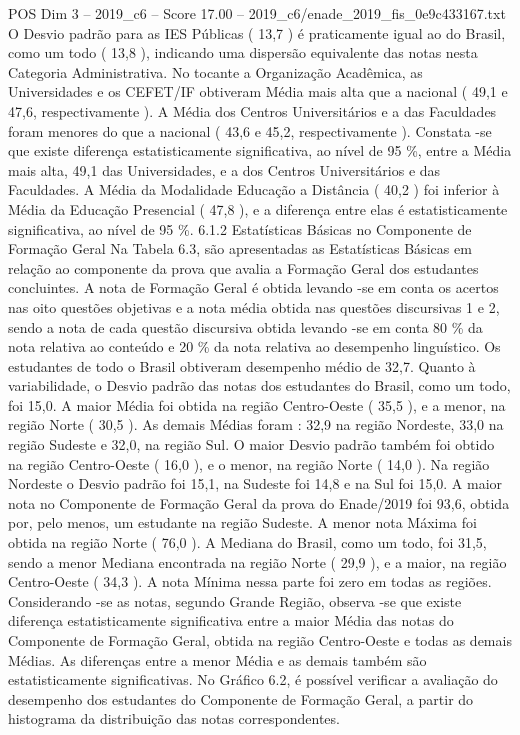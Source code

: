 \begin{textsample}{POS Dim 3 – 2019\_c6 – Score 17.00 – 2019\_c6/enade\_2019\_fis\_0e9c433167.txt}
O Desvio padrão para as IES Públicas ( 13,7 ) é praticamente igual ao do Brasil, como um todo ( 13,8 ), indicando uma dispersão equivalente das notas nesta Categoria Administrativa.
No tocante a Organização Acadêmica, as Universidades e os CEFET/IF obtiveram Média mais alta que a nacional ( 49,1 e 47,6, respectivamente ).
A Média dos Centros Universitários e a das Faculdades foram menores do que a nacional ( 43,6 e 45,2, respectivamente ).
Constata -se que existe diferença estatisticamente significativa, ao nível de 95 \%, entre a Média mais alta, 49,1 das Universidades, e a dos Centros Universitários e das Faculdades.
A Média da Modalidade Educação a Distância ( 40,2 ) foi inferior à Média da Educação Presencial ( 47,8 ), e a diferença entre elas é estatisticamente significativa, ao nível de 95 \%. 6.1.2 Estatísticas Básicas no Componente de Formação Geral Na Tabela 6.3, são apresentadas as Estatísticas Básicas em relação ao componente da prova que avalia a Formação Geral dos estudantes concluintes.
A nota de Formação Geral é obtida levando -se em conta os acertos nas oito questões objetivas e a nota média obtida nas questões discursivas 1 e 2, sendo a nota de cada questão discursiva obtida levando -se em conta 80 \% da nota relativa ao conteúdo e 20 \% da nota relativa ao desempenho linguístico.
Os estudantes de todo o Brasil obtiveram desempenho médio de 32,7.
Quanto à variabilidade, o Desvio padrão das notas dos estudantes do Brasil, como um todo, foi 15,0.
A maior Média foi obtida na região Centro-Oeste ( 35,5 ), e a menor, na região Norte ( 30,5 ).
As demais Médias foram : 32,9 na região Nordeste, 33,0 na região Sudeste e 32,0, na região Sul.
O maior Desvio padrão também foi obtido na região Centro-Oeste ( 16,0 ), e o menor, na região Norte ( 14,0 ).
Na região Nordeste o Desvio padrão foi 15,1, na Sudeste foi 14,8 e na Sul foi 15,0.
A maior nota no Componente de Formação Geral da prova do Enade/2019 foi 93,6, obtida por, pelo menos, um estudante na região Sudeste.
A menor nota Máxima foi obtida na região Norte ( 76,0 ).
A Mediana do Brasil, como um todo, foi 31,5, sendo a menor Mediana encontrada na região Norte ( 29,9 ), e a maior, na região Centro-Oeste ( 34,3 ).
A nota Mínima nessa parte foi zero em todas as regiões.
Considerando -se as notas, segundo Grande Região, observa -se que existe diferença estatisticamente significativa entre a maior Média das notas do Componente de Formação Geral, obtida na região Centro-Oeste e todas as demais Médias.
As diferenças entre a menor Média e as demais também são estatisticamente significativas.
No Gráfico 6.2, é possível verificar a avaliação do desempenho dos estudantes do Componente de Formação Geral, a partir do histograma da distribuição das notas correspondentes.

\end{textsample}
